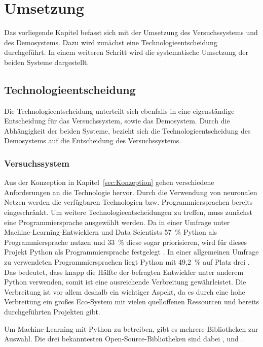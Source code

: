 \section{Umsetzung}

Das vorliegende Kapitel befasst sich mit der Umsetzung des Versuchssystems und des Demosystems.
Dazu wird zunächst eine Technologieentscheidung durchgeführt.
In einem weiteren Schritt wird die systematische Umsetzung der beiden Systeme dargestellt.

\subsection{Technologieentscheidung}
Die Technologieentscheidung unterteilt sich ebenfalls in eine eigenständige Entscheidung für das Versuchssystem, sowie das Demosystem.
Durch die Abhängigkeit der beiden Systeme, bezieht sich die Technologieentscheidung des Demosystems auf die Entscheidung des Versuchssystems.

\subsubsection{Versuchssystem}\label{sec:TechnologieVersuchssystem}

Aus der Konzeption in Kapitel~\ref{sec:Konzeption} gehen verschiedene Anforderungen an die Technologie hervor.
Durch die Verwendung von neuronalen Netzen werden die verfügbaren Technologien bzw. Programmiersprachen bereits eingeschränkt.
Um weitere Technologieentscheidungen zu treffen, muss zunächst eine Programmiersprache ausgewählt werden.
Da in einer Umfrage unter Machine-Learning-Entwicklern und Data Scientists 57~\% Python als Programmiersprache nutzen und 33~\% diese sogar priorisieren, wird für dieses Projekt Python als Programmiersprache festgelegt \autocite[vgl. ][S. 16]{vision_mobile_state_2017}.
In einer allgemeinen Umfrage zu verwendeten Programmiersprachen liegt Python mit 49,2~\% auf Platz drei \autocite[vgl.][]{yepis_2023_2023}.
Das bedeutet, dass knapp die Hälfte der befragten Entwickler unter anderem Python verwenden, somit ist eine ausreichende Verbreitung gewährleistet.
Die Verbreitung ist vor allem deshalb ein wichtiger Aspekt, da es durch eine hohe Verbreitung ein großes Eco-System mit vielen quelloffenen Ressourcen und bereits durchgeführten Projekten gibt.

Um Machine-Learning mit Python zu betreiben, gibt es mehrere Bibliotheken zur Auswahl.
Die drei bekanntesten Open-Source-Bibliotheken sind dabei ,  und  \autocite[vgl.][]{msv_tensorflow_2020}.

